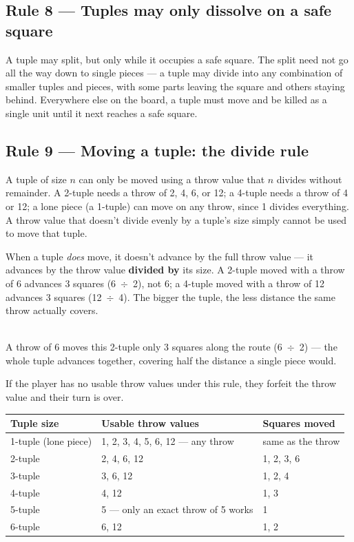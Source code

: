 \documentclass[10pt,a4paper]{article}
\newcommand{\ruletitle}[2]{\subsection*{Rule #1 --- #2}}
\begin{document}
\begin{center}
  
\end{center}

\ruletitle{8}{Tuples may only dissolve on a safe square}

A tuple may split, but only while it occupies a safe square. The split need
not go all the way down to single pieces --- a tuple may divide into any
combination of smaller tuples and pieces, with some parts leaving the square
and others staying behind. Everywhere else on the board, a tuple must move
and be killed as a single unit until it next reaches a safe square.

\begin{center}
  
\end{center}

\ruletitle{9}{Moving a tuple: the divide rule}

A tuple of size $n$ can only be moved using a throw value that $n$ divides
without remainder. A 2-tuple needs a throw of 2, 4, 6, or 12; a 4-tuple needs
a throw of 4 or 12; a lone piece (a 1-tuple) can move on any throw, since 1
divides everything. A throw value that doesn't divide evenly by a tuple's
size simply cannot be used to move that tuple.

When a tuple \emph{does} move, it doesn't advance by the full throw value ---
it advances by the throw value \textbf{divided by} its size. A 2-tuple
moved with a throw of 6 advances 3 squares (6~$\div$~2), not 6; a 4-tuple
moved with a throw of 12 advances 3 squares (12~$\div$~4). The bigger the
tuple, the less distance the same throw actually covers.

\begin{center}
  \\[1mm]
  {\small A throw of 6 moves this 2-tuple only 3 squares along the route (6~$\div$~2) ---
  the whole tuple advances together, covering half the distance a single piece would.}
\end{center}

If the player has no usable throw values under this rule, they forfeit the
throw value and their turn is over.

\begin{center}
\begin{tabular}{lll}
\textbf{Tuple size} & \textbf{Usable throw values} & \textbf{Squares moved} \\
\hline
1-tuple (lone piece) & 1, 2, 3, 4, 5, 6, 12 --- any throw & same as the throw \\
2-tuple & 2, 4, 6, 12 & 1, 2, 3, 6 \\
3-tuple & 3, 6, 12 & 1, 2, 4 \\
4-tuple & 4, 12 & 1, 3 \\
5-tuple & 5 --- only an exact throw of 5 works & 1 \\
6-tuple & 6, 12 & 1, 2 \\
\end{tabular}
\end{center}
\end{document}
